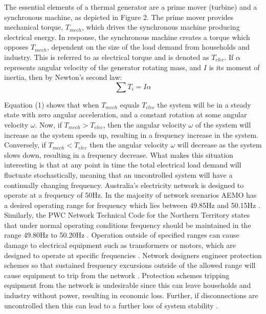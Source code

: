 \documentclass[12pt, a4paper]{article}
\begin{document}
The essential elements of a thermal generator are a prime mover (turbine) and a synchronous machine, as depicted in Figure 2. The prime mover provides mechanical torque, $T_{mech}$, which drives the synchronous machine producing electrical energy. In response, the synchronous machine creates a torque which opposes $T_{mech}$, dependent on the size of the load demand from households and industry. This is referred to as electrical torque and is denoted as $T_{elec}$. If $\alpha$ represents angular velocity of the generator rotating mass, and $I$ is its moment of inertia, then by Newton's second law:
\begin{equation}
\sum T_i = I \alpha 
\end{equation}

Equation (1) shows that when $T_{mech}$ equals $T_{elec}$ the system will be in a steady state with zero angular acceleration, and a constant rotation at some angular velocity $\omega$. Now, if $T_{mech} > T_{elec}$, then the angular velocity $\omega$ of the system will increase as the system speeds up, resulting in a frequency increase in the system. Conversely, if $T_{mech} < T_{elec}$ then the angular velocity $\omega$ will decrease as the system slows down, resulting in a frequency decrease. What makes this situation interesting is that at any point in time the total electrical load demand will fluctuate stochastically, meaning that an uncontrolled system will have a continually changing frequency. Australia's electricity network is designed to operate at a frequency of 50$\si{\hertz}$. In the majority of network scenarios AEMO has a desired operating range for frequency which lies between 49.85$\si{\hertz}$ and 50.15$\si{\hertz}$ \cite{AEMO2012}. Similarly, the PWC Network Technical Code for the Northern Territory states that under normal operating conditions frequency should be maintained in the range 49.80$\si{\hertz}$ to 50.20$\si{\hertz}$ \cite{PWC2018}. Operation outside of specified ranges can cause damage to electrical equipment such as transformers or motors, which are designed to operate at specific frequencies \cite{Sen2014}. Network designers engineer protection schemes so that sustained frequency excursions outside of the allowed range will cause equipment to trip from the network \cite{AEMO201804}. Protection schemes tripping equipment from the network is undesirable since this can leave households and industry without power, resulting in economic loss. Further, if disconnections are uncontrolled then this can lead to a further loss of system stability \cite{AEMO201804}.
\end{document}
